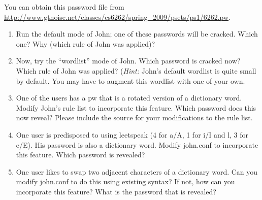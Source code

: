 \documentclass[11pt]{article}
\begin{document}
You can obtain this password file from \\
\url{http://www.gtnoise.net/classes/cs6262/spring_2009/psets/ps1/6262.pw}. 

\begin{enumerate}
\item Run the default mode of John; one of these passwords will be
  cracked.  Which one?  Why (which rule of John was applied)?

\item Now, try the ``wordlist'' mode of John.  Which password is cracked
  now?  Which rule of John was applied?  ({\em Hint:} John's default
  wordlist is quite small by default.  You may have to augment this
  wordlist with one of your own.

\item One of the users has a pw that is a rotated version of a
dictionary word. Modify John's rule list to incorporate this feature.
Which password does this now reveal?  Please include the source for your
modifications to the rule list.


\item One user is predisposed to using leetspeak (4 for a/A, 1 for i/I
and l, 3 for e/E). His password is also a dictionary word. Modify
john.conf to incorporate this feature.  Which password is revealed?


\item One user likes to swap two adjacent characters of a dictionary
word. Can you modify john.conf to do this using existing syntax? If not,
how can you incorporate this feature?  What is the password that is
revealed?



\end{enumerate}
\end{document}
